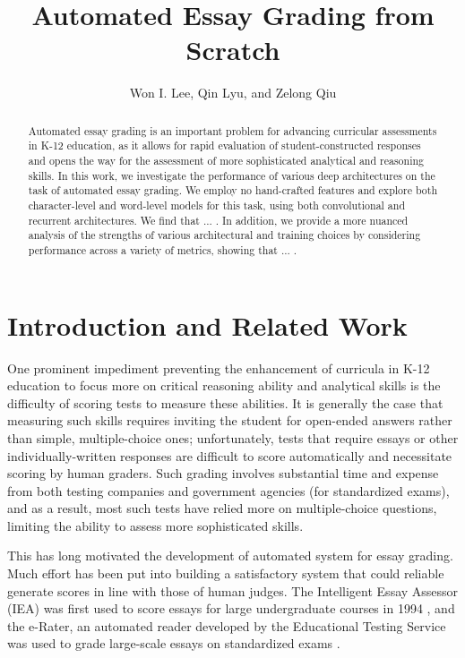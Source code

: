 \documentclass[10pt,psamsfonts]{amsart}
\title{Automated Essay Grading from Scratch}
\author{Won I. Lee, Qin Lyu, and Zelong Qiu}
\theoremstyle{definition}
\theoremstyle{remark}
\numberwithin{equation}{section}
\begin{document}
	
\maketitle

\begin{abstract}
	Automated essay grading is an important problem for advancing curricular assessments in K-12 education, as it allows for rapid evaluation of student-constructed responses and opens the way for the assessment of more sophisticated analytical and reasoning skills.  In this work, we investigate the performance of various deep architectures on the task of automated essay grading. We employ no hand-crafted features and explore both character-level and word-level models for this task, using both convolutional and recurrent architectures. We find that ... . In addition, we provide a more nuanced analysis of the strengths of various architectural and training choices by considering performance across a variety of metrics, showing that ... .
\end{abstract}

\section*{Introduction and Related Work}

One prominent impediment preventing the enhancement of curricula in K-12 education to focus more on critical reasoning ability and analytical skills is the difficulty of scoring tests to measure these abilities. It is generally the case that measuring such skills requires inviting the student for open-ended answers rather than simple, multiple-choice ones; unfortunately, tests that require essays or other individually-written responses are difficult to score automatically and necessitate scoring by human graders. Such grading involves substantial time and expense from both testing companies and government agencies (for standardized exams), and as a result, most such tests have relied more on multiple-choice questions, limiting the ability to assess more sophisticated skills.

This has long motivated the development of automated system for essay grading. Much effort has been put into building a satisfactory system that could reliable generate scores in line with those of human judges. The Intelligent Essay Assessor (IEA) was first used to score essays for large undergraduate courses in 1994 \cite{iea}, and the e-Rater, an automated reader developed by the Educational Testing Service was used to grade large-scale essays on standardized exams \cite{erater}.
\end{document}
